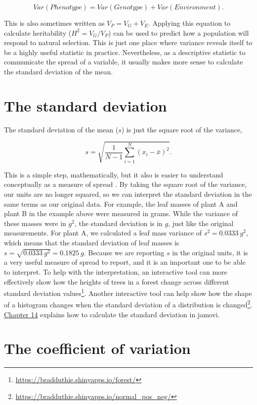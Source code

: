 \documentclass[
  openany]{krantz}
\begin{document}
\[Var(Phenotype) = Var(Genotype) + Var(Environment).\]

This is also sometimes written as \(V_{P} = V_{G} + V_{E}\).
Applying this equation to calculate heritability (\(H^{2} = V_{G} / V_{P}\)) can be used to predict how a population will respond to natural selection.
This is just one place where variance reveals itself to be a highly useful statistic in practice.
Nevertheless, as a descriptive statistic to communicate the spread of a variable, it usually makes more sense to calculate the standard deviation of the mean.

\hypertarget{the-standard-deviation}{%
\section{The standard deviation}\label{the-standard-deviation}}

The standard deviation of the mean (\(s\)) is just the square root of the variance,

\[s = \sqrt{\frac{1}{N - 1}\sum_{i = 1}^{N}\left(x_{i} - \bar{x} \right)^{2}}.\]

This is a simple step, mathematically, but it also is easier to understand conceptually as a measure of spread \citep{Navarro2022}.
By taking the square root of the variance, our units are no longer squared, so we can interpret the standard deviation in the same terms as our original data.
For example, the leaf masses of plant A and plant B in the example above were measured in grams.
While the variance of these masses were in \(g^{2}\), the standard deviation is in \(g\), just like the original measurements.
For plant A, we calculated a leaf mass variance of \(s^{2} = 0.0333\:g^{2}\), which means that the standard deviation of leaf masses is \(s = \sqrt{0.0333\:g^{2}} = 0.1825\:g\).
Because we are reporting \(s\) in the original units, it is a very useful measure of spread to report, and it is an important one to be able to interpret.
To help with the interpretation, an interactive tool can more effectively show how the heights of trees in a forest change across different standard deviation values\footnote{\url{https://bradduthie.shinyapps.io/forest/}}.
Another interactive tool can help show how the shape of a histogram changes when the standard deviation of a distribution is changed\footnote{\url{https://bradduthie.shinyapps.io/normal_pos_neg/}}.
\protect\hyperlink{Chapter_14}{Chapter 14} explains how to calculate the standard deviation in jamovi.

\hypertarget{the-coefficient-of-variation}{%
\section{The coefficient of variation}\label{the-coefficient-of-variation}}
\end{document}
